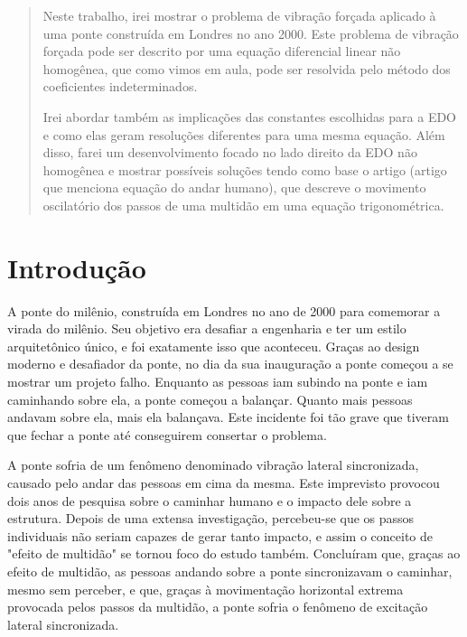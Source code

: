 \documentclass[]{article}
\begin{document}
\begin{abstract}
    Neste trabalho, irei mostrar o problema de vibração forçada aplicado à uma ponte construída em Londres no ano 2000.
Este problema de vibração forçada pode ser descrito por uma equação diferencial linear não homogênea, que como vimos em aula,
pode ser resolvida pelo método dos coeficientes indeterminados.

Irei abordar também as implicações das constantes escolhidas para a EDO e como elas
geram resoluções diferentes para uma mesma equação. Além disso, farei um desenvolvimento 
focado no lado direito da EDO não homogênea e mostrar possíveis soluções tendo como base
o artigo (artigo que menciona equação do andar humano), que descreve o movimento oscilatório dos passos 
de uma multidão em uma equação trigonométrica.
\end{abstract}
\pagebreak 

\section{Introdução}

A ponte do milênio, construída em Londres no ano de 2000 para comemorar
a virada do milênio. Seu objetivo era desafiar a engenharia e ter um estilo arquitetônico único, e foi exatamente isso que aconteceu.
Graças ao design moderno e desafiador da ponte, no dia da sua inauguração a ponte começou a se mostrar um projeto falho.
Enquanto as pessoas iam subindo na ponte e iam caminhando sobre ela, a ponte começou a balançar. Quanto mais pessoas andavam sobre ela,
mais ela balançava. Este incidente foi tão grave que tiveram que fechar a ponte até conseguirem consertar o problema.

A ponte sofria de um fenômeno denominado vibração lateral sincronizada, causado pelo andar das pessoas em cima da mesma.
Este imprevisto provocou dois anos de pesquisa sobre o caminhar humano e o impacto dele sobre a estrutura. 
Depois de uma extensa investigação, percebeu-se que os passos individuais não seriam capazes de gerar tanto impacto, e assim
o conceito de "efeito de multidão" se tornou foco do estudo também. Concluíram que, graças ao efeito de multidão,
as pessoas andando sobre a ponte sincronizavam o caminhar, mesmo sem perceber, e que, graças à movimentação horizontal extrema provocada pelos
passos da multidão, a ponte sofria o fenômeno de excitação lateral sincronizada.
\end{document}
